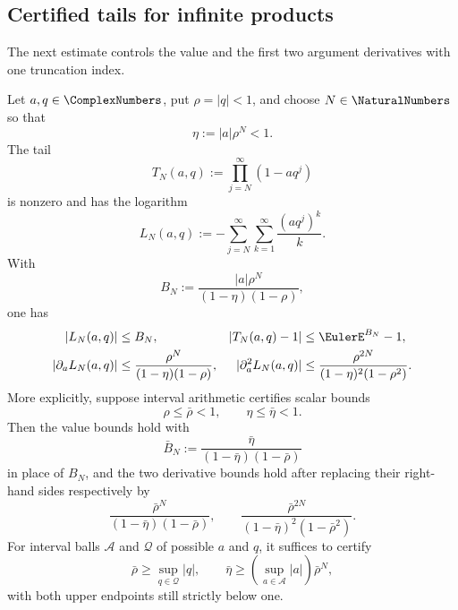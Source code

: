\subsection{Certified tails for infinite products}
\label{sec:certified-product-tails}

The next estimate controls the value and the first two argument derivatives
with one truncation index.

\begin{theorem}
\label{thm:qpoch-tail-certificate}
Let \(a,q\in\ComplexNumbers\), put \(\rho=\lvert q\rvert<1\), and choose \(N\in\NaturalNumbers\) so that
\[
  \eta:=\lvert a\rvert\rho^N<1.
\]
The tail
\[
  T_N(a,q):=\prod_{j=N}^{\infty}(1-aq^j)
\]
is nonzero and has the logarithm
\[
  L_N(a,q):=-\sum_{j=N}^{\infty}\sum_{k=1}^{\infty}
                 \frac{(aq^j)^k}{k}.
\]
With
\[
  B_N:=\frac{\lvert a\rvert\rho^N}
              {(1-\eta)(1-\rho)},
\]
one has
\begin{align}
 \lvert L_N(a,q)\rvert&\le B_N,
 &\lvert T_N(a,q)-1\rvert&\le \EulerE^{B_N}-1,
 \label{eq:qpoch-tail-value}\\
 \lvert\partial_aL_N(a,q)\rvert
   &\le\frac{\rho^N}{(1-\eta)(1-\rho)},
 &\lvert\partial_a^2L_N(a,q)\rvert
   &\le\frac{\rho^{2N}}{(1-\eta)^2(1-\rho^2)}.
 \label{eq:qpoch-tail-derivatives}
\end{align}
More explicitly, suppose interval arithmetic certifies scalar bounds
\[
 \rho\le\bar\rho<1,\qquad \eta\le\bar\eta<1.
\]
Then the value bounds hold with
\[
 \bar B_N:=\frac{\bar\eta}
 {(1-\bar\eta)(1-\bar\rho)}
\]
in place of \(B_N\), and the two derivative bounds hold after replacing
their right-hand sides respectively by
\[
 \frac{\bar\rho^N}{(1-\bar\eta)(1-\bar\rho)},
 \qquad
 \frac{\bar\rho^{2N}}{(1-\bar\eta)^2(1-\bar\rho^2)}.
\]
For interval balls \(\mathcal A\) and \(\mathcal Q\) of possible \(a\) and
\(q\), it suffices to certify
\[
 \bar\rho\ge\sup_{q\in\mathcal Q}\lvert q\rvert,\qquad
 \bar\eta\ge
   \left(\sup_{a\in\mathcal A}\lvert a\rvert\right)\bar\rho^N,
\]
with both upper endpoints still strictly below one.
\end{theorem}

